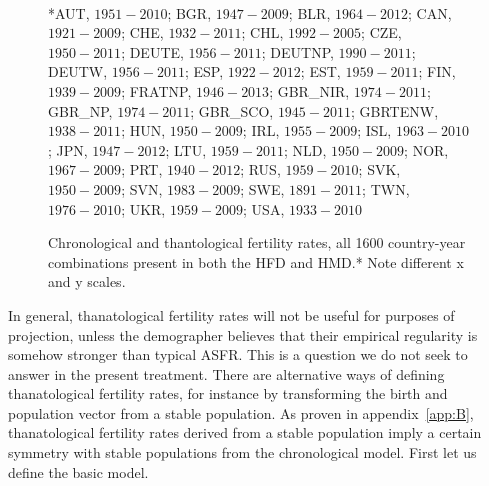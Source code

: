 \documentclass{article}
\begin{document}
\begin{figure}[h!]
	\caption{Chronological and thantological fertility rates, all 1600
	country-year combinations present in both the HFD and HMD.* Note different x
	and y scales.}
	\label{fig:Fxcompare}
	\begin{center}
	\\
	\end{center}
	\begin{tiny}
	*AUT, $1951-2010$; BGR, $1947-2009$; BLR, $1964-2012$; CAN, $1921-2009$; 
	CHE, $1932-2011$; CHL, $1992-2005$; CZE, $1950-2011$; DEUTE, $1956-2011$; 
	DEUTNP, $1990-2011$; DEUTW, $1956-2011$; ESP, $1922-2012$; EST, $1959-2011$; 
	FIN, $1939-2009$; FRATNP, $1946-2013$; GBR\_NIR, $1974-2011$; GBR\_NP,
	$1974-2011$; GBR\_SCO, $1945-2011$; GBRTENW, $1938-2011$; HUN, $1950-2009$;
	IRL, $1955-2009$; ISL, $1963-2010$; JPN, $1947-2012$; LTU, $1959-2011$; NLD, $1950-2009$; 
	NOR, $1967-2009$; PRT, $1940-2012$; RUS, $1959-2010$; SVK, $1950-2009$; 
	SVN, $1983-2009$; SWE, $1891-2011$; TWN, $1976-2010$; UKR, $1959-2009$; 
	USA, $1933-2010$
	\end{tiny}
\end{figure}

In general, thanatological fertility rates will not be useful for purposes of
projection, unless the demographer believes that their empirical regularity is
somehow stronger than typical ASFR. This is a question we do not seek to answer
in the present treatment. There are alternative ways of defining
thanatological fertility rates, for instance by transforming the birth and
population vector from a stable population. As proven in appendix~\ref{app:B},
thanatological fertility rates derived from a stable population imply a certain
symmetry with stable populations from the chronological model. First let us
define the basic model.

\FloatBarrier
\end{document}
